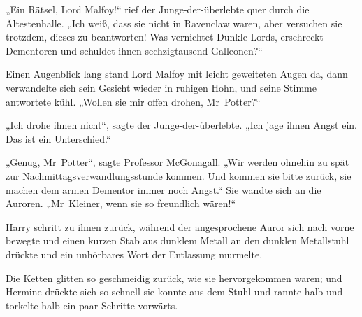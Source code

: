 „Ein Rätsel, Lord Malfoy!“ rief der Junge-der-überlebte quer durch die Ältestenhalle.
„Ich weiß, dass sie nicht in Ravenclaw waren, aber versuchen sie trotzdem, dieses zu beantworten! Was vernichtet Dunkle Lords, erschreckt Dementoren und schuldet ihnen sechzigtausend Galleonen?“

Einen Augenblick lang stand Lord Malfoy mit leicht geweiteten Augen da, dann verwandelte sich sein Gesicht wieder in ruhigen Hohn, und seine Stimme antwortete kühl.
„Wollen sie mir offen drohen, Mr~Potter?“

„Ich drohe ihnen nicht“, sagte der Junge-der-überlebte.
„Ich jage ihnen Angst ein. Das ist ein Unterschied.“

„Genug, Mr~Potter“, sagte Professor McGonagall.
„Wir werden ohnehin zu spät zur Nachmittagsverwandlungsstunde kommen. Und kommen sie bitte zurück, sie machen dem armen Dementor immer noch Angst.“
Sie wandte sich an die Auroren.
„Mr~Kleiner, wenn sie so freundlich wären!“

Harry schritt zu ihnen zurück, während der angesprochene Auror sich nach vorne bewegte und einen kurzen Stab aus dunklem Metall an den dunklen Metallstuhl drückte und ein unhörbares Wort der Entlassung murmelte.

Die Ketten glitten so geschmeidig zurück, wie sie hervorgekommen waren; und Hermine drückte sich so schnell sie konnte aus dem Stuhl und rannte halb und torkelte halb ein paar Schritte vorwärts.

